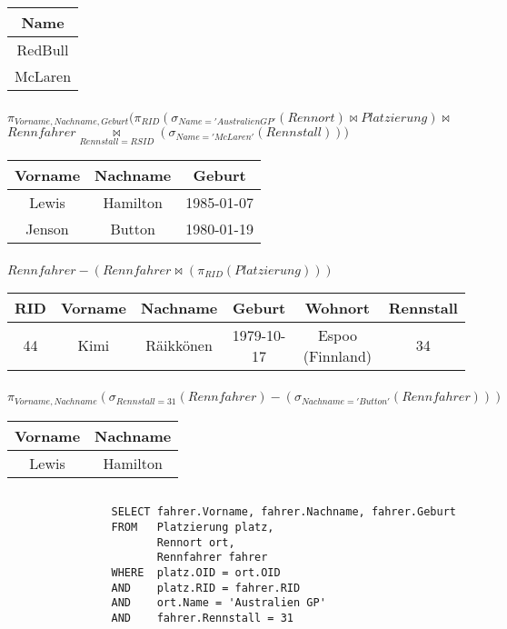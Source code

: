 \documentclass[ngerman]{gdb-aufgabenblatt}
\begin{document}
			\begin{tabular}{c}
				Name \\
				\hline
				RedBull \\
				McLaren \\
				\hline
			\end{tabular}
		\subsubsection{} %
			$\pi_{Vorname, Nachname, Geburt}(\pi_{RID}(\sigma_{Name='Australien GP'}(Rennort) \bowtie Platzierung) \bowtie $\\$ Rennfahrer \underset{Rennstall=RSID}{\bowtie} (\sigma_{Name='McLaren'}(Rennstall)))$
			
			\begin{tabular}{c|c|c}
				Vorname & Nachname & Geburt \\
				\hline
				Lewis & Hamilton & 1985-01-07 \\
				Jenson & Button & 1980-01-19 \\
				\hline
			\end{tabular}
		\subsubsection{} %
			$Rennfahrer - (Rennfahrer \bowtie (\pi_{RID}(Platzierung)))$
			
			\begin{tabular}{c|c|c|c|c|c}
				RID & Vorname & Nachname & Geburt & Wohnort & Rennstall \\
				\hline
				44 & Kimi & Räikkönen & 1979-10-17 & Espoo (Finnland) & 34 \\
				\hline
			\end{tabular}
		\subsubsection{} %
			$\pi_{Vorname, Nachname}(\sigma_{Rennstall = 31}(Rennfahrer) - (\sigma_{Nachname='Button'}(Rennfahrer)))$
			
			\begin{tabular}{c|c}
				Vorname & Nachname \\
				\hline
				Lewis & Hamilton \\
				\hline
			\end{tabular}
	\subsection{} %
		\subsubsection{} %
			\begin{verbatim}
			    SELECT fahrer.Vorname, fahrer.Nachname, fahrer.Geburt
			    FROM   Platzierung platz,
			           Rennort ort,
			           Rennfahrer fahrer
			    WHERE  platz.OID = ort.OID
			    AND    platz.RID = fahrer.RID
			    AND    ort.Name = 'Australien GP'
			    AND    fahrer.Rennstall = 31
			\end{verbatim}
\end{document}
